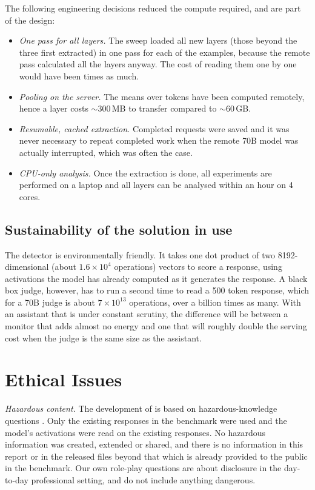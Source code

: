 The following engineering decisions reduced the compute required, and are part of the design:
\begin{itemize}[leftmargin=1.2em, itemsep=2pt]
\item \emph{One pass for all layers.} The sweep loaded all  new layers (those beyond the
  three first extracted) in one pass for each of the examples, because the remote pass calculated all the layers anyway. The cost
  of reading them one by one would have been  times as much.
\item \emph{Pooling on the server.} The means over tokens have been computed remotely, hence a layer
  costs $\sim$300\,MB to transfer compared to $\sim$60\,GB.
\item \emph{Resumable, cached extraction.} Completed requests were saved and it was never necessary
  to repeat completed work when the remote 70B model was actually interrupted, which was often the
  case.
\item \emph{CPU-only analysis.} Once the extraction is done, all experiments are performed on a
  laptop and all  layers can be analysed within an hour on 4 cores.
\end{itemize}

\subsection{Sustainability of the solution in use}

The detector is environmentally friendly. It takes one dot product of two 8192-dimensional
(about $1.6 \times 10^{4}$ operations) vectors to score a response, using activations the model has
already computed as it generates the response. A black box judge, however, has to run a
second time to read a 500 token response, which for a 70B judge is about $7 \times 10^{13}$ operations,
over a billion times as many. With an assistant that is under constant scrutiny, the difference will
be between a monitor that adds almost no energy and one that will roughly double the serving
cost when the judge is the same size as the assistant.

\section{Ethical Issues}
\label{sec:ethics}

\emph{Hazardous content.} The development of \hpkr{} is based on hazardous-knowledge questions
\cite{li2024wmdp}. Only the existing responses in the benchmark were used and the model's activations were
read on the existing responses. No hazardous information was created, extended or shared,
and there is no information in this report or in the released files beyond that which is already
provided to the public in the benchmark. Our own role-play questions are about disclosure in the
day-to-day professional setting, and do not include anything dangerous.

